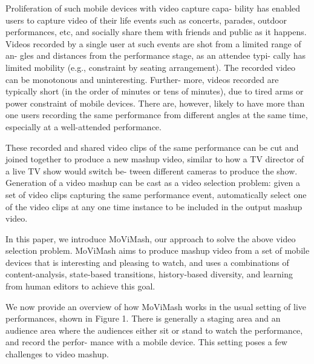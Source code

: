 \documentclass{sig-alternate}
\begin{document}
Proliferation of such mobile devices with video capture capa-
bility has enabled users to capture video of their life events such
as concerts, parades, outdoor performances, etc, and socially share
them with friends and public as it happens. Videos recorded by
a single user at such events are shot from a limited range of an-
gles and distances from the performance stage, as an attendee typi-
cally has limited mobility (e.g., constraint by seating arrangement).
The recorded video can be monotonous and uninteresting. Further-
more, videos recorded are typically short (in the order of minutes
or tens of minutes), due to tired arms or power constraint of mobile
devices. There are, however, likely to have more than one users
recording the same performance from different angles at the same
time, especially at a well-attended performance.

These recorded and shared video clips of the same performance
can be cut and joined together to produce a new mashup video,
similar to how a TV director of a live TV show would switch be-
tween different cameras to produce the show. Generation of a video
mashup can be cast as a video selection problem: given a set of
video clips capturing the same performance event, automatically
select one of the video clips at any one time instance to be included
in the output mashup video.

In this paper, we introduce MoViMash, our approach to solve
the above video selection problem. MoViMash aims to produce
mashup video from a set of mobile devices that is interesting and
pleasing to watch, and uses a combinations of content-analysis,
state-based transitions, history-based diversity, and learning from
human editors to achieve this goal.

We now provide an overview of how MoViMash works in the
usual setting of live performances, shown in Figure 1. There is
generally a staging area and an audience area where the audiences
either sit or stand to watch the performance, and record the perfor-
mance with a mobile device. This setting poses a few challenges to
video mashup.
\end{document}
